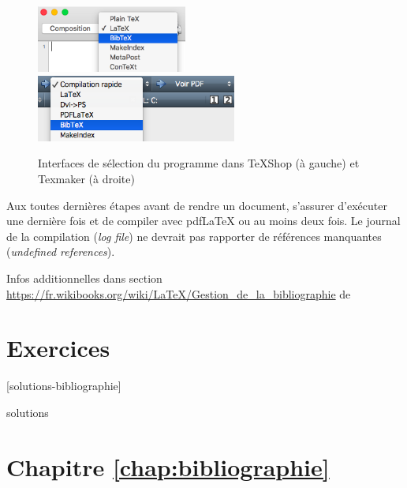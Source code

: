 \begin{figure}
  \centering
  \includegraphics[height=2.2cm]{bibtex-texshop}
  \qquad
  \includegraphics[height=2.2cm]{bibtex-texmaker}
  \caption{Interfaces de sélection du programme {\BibTeX} dans TeXShop
    (à gauche)
    et Texmaker (à droite)}
  \label{fig:bibliographie:editeurs}
\end{figure}

\begin{conseil}
  Aux toutes dernières étapes avant de rendre un document, s'assurer
  d'exécuter {\BibTeX} une dernière fois et de compiler avec
  pdf{\LaTeX} ou {\XeLaTeX} au moins deux fois. Le journal de la
  compilation (\emph{log file}) ne devrait pas rapporter de références
  manquantes (\emph{undefined references}).
\end{conseil}

Infos additionnelles dans section \href{Gestion de la
  bibliographie}{https://fr.wikibooks.org/wiki/LaTeX/Gestion_de_la_bibliographie}
de \citet{wikilivres:latex}



\section{Exercices}
\label{sec:bibliographie:exercices}

[solutions-bibliographie]

\begin{Filesave}{solutions}
\section*{Chapitre \ref*{chap:bibliographie}}

\end{Filesave}


